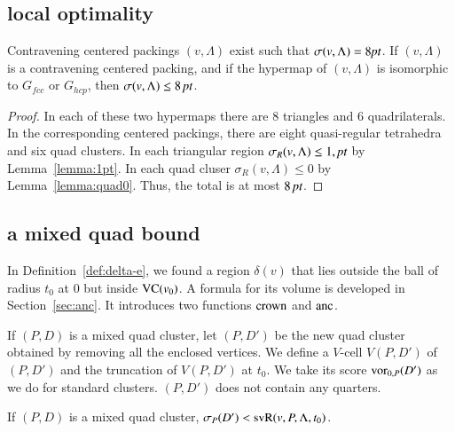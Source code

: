 \subsection{local optimality}%
\label{sec:local-opt}

\begin{lemma}  %
Contravening centered packings $(v,\Lambda)$ exist such that
$\sigma(v,\Lambda)=8\hbox{\it pt}$. If $(v,\Lambda)$ is a contravening centered packing, and
if the hypermap of $(v,\Lambda)$ is isomorphic to $G_{fcc}$ or $G_{hcp}$,
then $\sigma(v,\Lambda) \le 8\,\hbox{\it pt}$.
\end{lemma} %

\begin{proof}
In each of these two hypermaps there are $8$ triangles and
$6$ quadrilaterals.  In the corresponding centered packings,
there are  eight quasi-regular tetrahedra and six quad clusters.
In each triangular region $\sigma_R(v,\Lambda)\le 1,\hbox{\it pt}$ by Lemma~\ref{lemma:1pt}.
In each quad cluser $\sigma_R(v,\Lambda)\le 0$ by Lemma~\ref{lemma:quad0}.  
Thus, the total is
at most $8\,\hbox{\it pt}$.
\end{proof}











\subsection{a mixed quad bound}%

In Definition~\ref{def:delta-e}, we found a region $\delta(v)$
that lies outside the ball of radius $t_0$ at $0$ but inside
${\operatorname{VC}}(v_0)$.  A formula for its volume is developed
in Section~\ref{sec:anc}.  It introduces two functions
$\operatorname{crown}$ and $\operatorname{anc}$.


\smallskip
If $(P,D)$ is a mixed quad cluster, let $(P,D')$ be the new quad
cluster obtained by removing all the enclosed vertices.  We define
a $V$-cell $V(P,D')$ of $(P,D')$ and the truncation of $V(P,D')$
at $t_0$. We take its score ${\operatorname{vor}}_{0,P}(D')$  as we do for
standard clusters.  $(P,D')$ does not contain any quarters.

\begin{lemma} \label{lemma:mixed-vor0}
If $(P,D)$ is a mixed quad cluster, $\sigma_P(D') <
{\operatorname{svR}}(v,P,\Lambda,t_0)$.  
\end{lemma}

